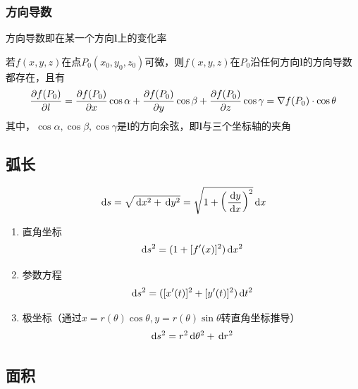 \subsubsection{方向导数}
方向导数即在某一个方向$\mathbf{l}$上的变化率
\begin{theorem}
若$f(x,y,z)$在点$P_0(x_0,y_0,z_0)$可微，则$f(x,y,z)$在$P_0$沿任何方向$\mathbf{l}$的方向导数都存在，且有
\[\dfrac{\partial f(P_0)}{\partial l}=\dfrac{\partial f(P_0)}{\partial x}\cos\alpha+\dfrac{\partial f(P_0)}{\partial y}\cos\beta+\dfrac{\partial f(P_0)}{\partial z}\cos\gamma=\nabla f(P_0)\cdot\cos\theta\]
其中，$\cos\alpha,\cos\beta,\cos\gamma$是$\mathbf{l}$的方向余弦，即$\mathbf{l}$与三个坐标轴的夹角
\end{theorem}

\subsection{弧长}
\begin{center}
\end{center}
\[\,\mathrm{d} s=\sqrt{\,\mathrm{d} x^2+\,\mathrm{d} y^2}=\sqrt{1+\left(\dfrac{\,\mathrm{d} y}{\,\mathrm{d} x}\right)^2}\,\mathrm{d} x\]
\begin{enumerate}
	\item 直角坐标
	\[\,\mathrm{d} s^2=(1+[f'(x)]^2)\,\mathrm{d} x^2\]
	\item 参数方程
	\[\,\mathrm{d} s^2=([x'(t)]^2+[y'(t)]^2)\,\mathrm{d} t^2\]
	\item 极坐标（通过$x=r(\theta)\cos\theta,y=r(\theta)\sin\theta$转直角坐标推导）
	\[\,\mathrm{d} s^2=r^2\,\mathrm{d}\theta^2+\,\mathrm{d} r^2\]
\end{enumerate}

\subsection{面积}
